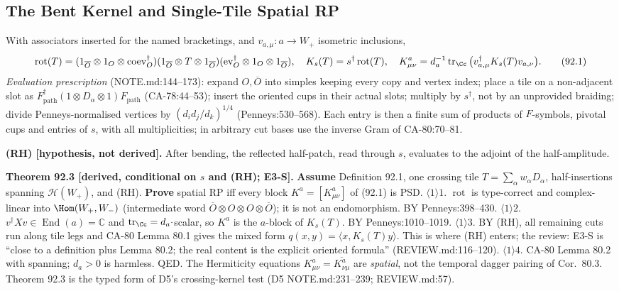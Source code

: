 \subsection{The Bent Kernel and Single-Tile Spatial RP}

With associators inserted for the named bracketings, and \(v_{a,\mu}:a\to W_+\) isometric inclusions,
\begin{equation}
  \operatorname{rot}(T)=(1_{\overline O}\otimes1_O\otimes\mathrm{coev}_O^\dagger)(1_{\overline O}\otimes T\otimes1_{\overline O})
  (\mathrm{ev}_O^\dagger\otimes1_O\otimes1_{\overline O}),\quad K_s(T)=s^\dagger\operatorname{rot}(T),\quad
  K^a_{\mu\nu}=d_a^{-1}\operatorname{tr}_\Cc\big(v_{a,\mu}^\dagger K_s(T)v_{a,\nu}\big).\tag{92.1}
\end{equation}
\emph{Evaluation prescription} (NOTE.md:144--173): expand \(O,\overline O\) into simples keeping every copy and vertex
index; place a tile on a non-adjacent slot as \(F_{\mathrm{path}}^\dagger(1\otimes D_\alpha\otimes1)F_{\mathrm{path}}\)
(CA-78:44--53); insert the oriented cups in their actual slots; multiply by \(s^\dagger\), not by an unprovided
braiding; divide Penneys-normalised vertices by \((d_id_j/d_k)^{1/4}\) (Penneys:530--568).  Each entry is then a
finite sum of products of \(F\)-symbols, pivotal cups and entries of \(s\), with all multiplicities; in arbitrary
cut bases use the inverse Gram of CA-80:70--81.

\textbf{(RH) [hypothesis, not derived].}  After bending, the reflected half-patch, read through \(s\), evaluates to the
adjoint of the half-amplitude.

\textbf{Theorem 92.3 [derived, conditional on \(s\) and (RH); E3-S].}  \textbf{Assume} Definition 92.1, one crossing
tile \(T=\sum_\alpha w_\alpha D_\alpha\), half-insertions spanning \(\mathcal H(W_+)\), and (RH).  \textbf{Prove}
spatial RP iff every block \(K^a=[K^a_{\mu\nu}]\) of (92.1) is PSD.
\(\langle1\rangle1\). \(\operatorname{rot}\) is type-correct and complex-linear into \(\Hom(W_+,W_-)\) (intermediate word
\(\overline O\otimes O\otimes O\otimes\overline O\)); it is not an endomorphism.  BY Penneys:398--430.
\(\langle1\rangle2\). \(v^\dagger Xv\in\operatorname{End}(a)=\mathbb C\) and \(\operatorname{tr}_\Cc=d_a\cdot\)scalar, so
\(K^a\) is the \(a\)-block of \(K_s(T)\).  BY Penneys:1010--1019.
\(\langle1\rangle3\). BY (RH), all remaining cuts run along tile legs and CA-80 Lemma 80.1 gives the mixed form
\(q(x,y)=\langle x,K_s(T)y\rangle\).  This is where (RH) enters; the review: E3-S is ``close to a definition plus
Lemma 80.2; the real content is the explicit oriented formula'' (REVIEW.md:116--120).
\(\langle1\rangle4\). CA-80 Lemma 80.2 with spanning; \(d_a>0\) is harmless.  QED.
The Hermiticity equations \(K^a_{\mu\nu}=\overline{K^a_{\nu\mu}}\) are \emph{spatial}, not the temporal dagger pairing of
Cor.~80.3.  Theorem 92.3 is the typed form of D5's crossing-kernel test (D5 NOTE.md:231--239; REVIEW.md:57).

